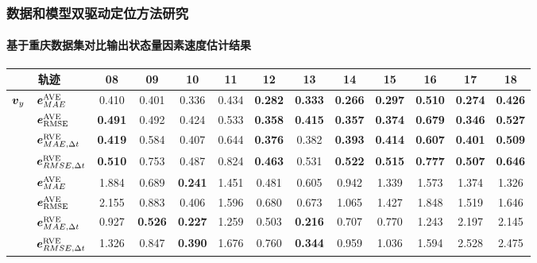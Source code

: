 \begin{frame} 
 	\frametitle{数据和模型双驱动定位方法研究}
 	\framesubtitle{基于重庆数据集对比输出状态量因素速度估计结果}
    {\small
    \setlength{\tabcolsep}{2pt}
		\begin{tabular*}{\linewidth}{@{\extracolsep{\fill}}clccccccccccc}
			\toprule
			\multicolumn{2}{c}{轨迹} & 08 & 09 & 10 & 11 & 12 & 13 & 14 & 15 & 16 & 17 & 18 \\
			\midrule
			\multirow{4}{*}{$\vb*{v}_y$} 
			& $\vb*{e}^{\mathrm{AVE}}_{MAE}$ 
			& 0.410 & 0.401 & 0.336 & 0.434 & \textbf{0.282} & \textbf{0.333} & \textbf{0.266} & \textbf{0.297} & \textbf{0.510} & \textbf{0.274} & \textbf{0.426} \\         
			& $\vb*{e}^{\mathrm{AVE}}_{\mathrm{RMSE}}$          
			& \textbf{0.491} & 0.492 & 0.424 & 0.533 & \textbf{0.358} & \textbf{0.415} & \textbf{0.357} & \textbf{0.374} & \textbf{0.679} & \textbf{0.346} & \textbf{0.527} \\ 
			& $\vb*{e}^{\mathrm{RVE}}_{MAE, \Delta t}$ 
			& \textbf{0.419} & 0.584 & 0.407 & 0.644 & \textbf{0.376} & 0.382 & \textbf{0.393} & \textbf{0.414} & \textbf{0.607} & \textbf{0.401} & \textbf{0.509} \\
			& $\vb*{e}^{\mathrm{RVE}}_{RMSE,\Delta t}$ 
			& \textbf{0.510} & 0.753 & 0.487 & 0.824 & \textbf{0.463} & 0.531 & \textbf{0.522} & \textbf{0.515} & \textbf{0.777} & \textbf{0.507} & \textbf{0.646} \\ \addlinespace[1mm]
			\multirow{4}{*}{$\Delta\vb*{v}_y$} 
			& $\vb*{e}^{\mathrm{AVE}}_{MAE}$ 
			& 1.884 & 0.689 & \textbf{0.241} & 1.451 & 0.481 & 0.605 & 0.942 & 1.339 & 1.573 & 1.374 & 1.326 \\         
			& $\vb*{e}^{\mathrm{AVE}}_{\mathrm{RMSE}}$         
			& 2.155 & 0.883 & 0.406 & 1.596 & 0.680 & 0.673 & 1.065 & 1.427 & 1.848 & 1.519 & 1.646 \\
			& $\vb*{e}^{\mathrm{RVE}}_{MAE, \Delta t}$ 
			& 0.927 & \textbf{0.526} & \textbf{0.227} & 1.259 & 0.503 & \textbf{0.216} & 0.707 & 0.770 & 1.243 & 2.197 & 2.145 \\
			& $\vb*{e}^{\mathrm{RVE}}_{RMSE,\Delta t}$ 
			& 1.326 & 0.847 & \textbf{0.390} & 1.676 & 0.760 & \textbf{0.344} & 0.959 & 1.036 & 1.594 & 2.528 & 2.475 \\
			\bottomrule 
		\end{tabular*}
	}	
\end{frame}

